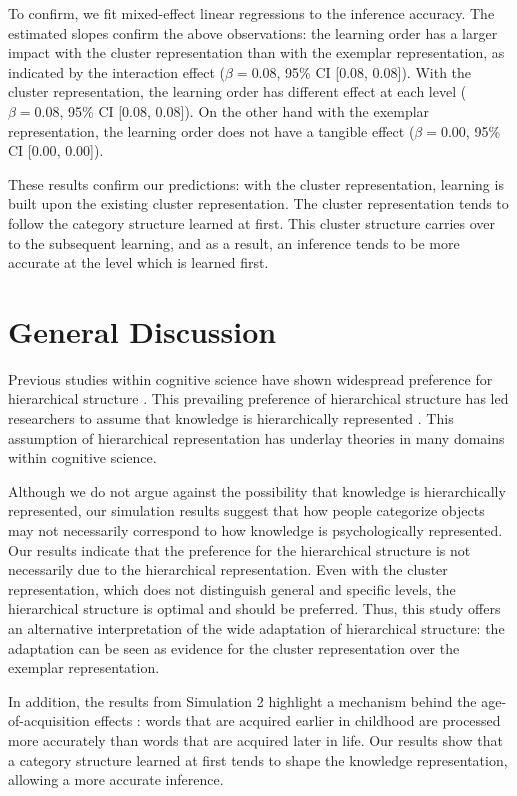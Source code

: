 \documentclass[doc]{apa6}
\begin{document}
To confirm, we fit mixed-effect linear regressions to the inference accuracy. The estimated slopes
confirm the above observations: the learning order has a larger impact with the cluster
representation than with the exemplar representation, as indicated by the interaction effect
($\beta=0.08$, 95\% CI [$0.08$, $0.08$]). With the cluster representation, the learning order has
different effect at each level ($\beta=0.08$, 95\% CI [$0.08$, $0.08$]). On the other hand with the
exemplar representation, the learning order does not have a tangible effect ($\beta=0.00$, 95\%
CI [$0.00$, $0.00$]).

These results confirm our predictions: with the cluster representation, learning is built upon the
existing cluster representation. The cluster representation tends to follow the category structure
learned at first.  This cluster structure carries over to the subsequent learning, and as a result,
an inference tends to be more accurate at the level which is learned first.


\section*{General Discussion}

Previous studies within cognitive science have shown widespread preference for hierarchical
structure \parencite[e.g.,][]{Rosch1976a}. This prevailing preference of hierarchical structure has
led researchers to assume that knowledge is hierarchically represented
\parencite[e.g.,][]{Markman1984a, Markman1989a}.  This assumption of hierarchical representation has
underlay theories in many domains within cognitive science.

Although we do not argue against the possibility that knowledge is hierarchically represented, our
simulation results suggest that how people categorize objects may not necessarily correspond to how
knowledge is psychologically represented. Our results indicate that the preference for the
hierarchical structure is not necessarily due to the hierarchical representation. Even with the
cluster representation, which does not distinguish general and specific levels, the hierarchical
structure is optimal and should be preferred. Thus, this study offers an alternative interpretation
of the wide adaptation of hierarchical structure: the adaptation can be seen as evidence for the
cluster representation over the exemplar representation.

In addition, the results from Simulation 2 highlight a mechanism behind the age-of-acquisition
effects \parencite{Gerhand1998a, Morrison1995a}: words that are acquired earlier in childhood are
processed more accurately than words that are acquired later in life. Our results show that a
category structure learned at first tends to shape the knowledge representation, allowing a more
accurate inference.
\end{document}
